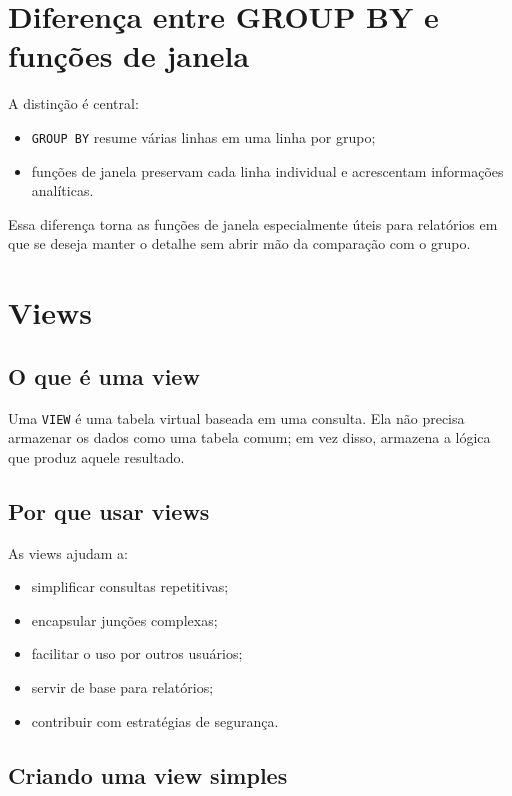 \section{Diferença entre GROUP BY e funções de janela}

A distinção é central:

\begin{itemize}
    \item \texttt{GROUP BY} resume várias linhas em uma linha por grupo;
    \item funções de janela preservam cada linha individual e acrescentam informações analíticas.
\end{itemize}

Essa diferença torna as funções de janela especialmente úteis para relatórios em que se deseja manter o detalhe sem abrir mão da comparação com o grupo.

\section{Views}

\subsection{O que é uma view}

Uma \texttt{VIEW} é uma tabela virtual baseada em uma consulta. Ela não precisa armazenar os dados como uma tabela comum; em vez disso, armazena a lógica que produz aquele resultado.

\subsection{Por que usar views}

As views ajudam a:
\begin{itemize}
    \item simplificar consultas repetitivas;
    \item encapsular junções complexas;
    \item facilitar o uso por outros usuários;
    \item servir de base para relatórios;
    \item contribuir com estratégias de segurança.
\end{itemize}

\subsection{Criando uma view simples}

